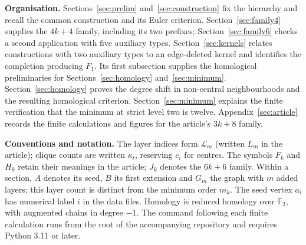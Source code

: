 \noindent\textbf{Organisation.}
Sections~\ref{sec:prelim} and~\ref{sec:construction} fix the hierarchy and
recall the common construction and its Euler criterion. Section~\ref{sec:family4} supplies
the $4k+4$ family, including its two prefixes; Section~\ref{sec:family6}
checks a second application with five auxiliary types. Section~\ref{sec:kernels}
relates constructions with two auxiliary types to an edge-deleted kernel and
identifies the completion producing $F_1$. Its first subsection supplies the
homological preliminaries for Sections~\ref{sec:homology} and~\ref{sec:minimum}.
Section~\ref{sec:homology} proves
the degree shift in non-central neighbourhoods and the resulting homological
criterion. Section~\ref{sec:minimum} explains the finite verification that the minimum at
strict level two is twelve. Appendix~\ref{sec:article} records the finite calculations and
figures for the article's $3k+8$ family.

\noindent\textbf{Conventions and notation.}
The layer indices form $\mathcal L_m$ (written $L_m$ in the article); clique counts are
written $\kappa_t$, reserving $c_i$ for centres. The symbols $F_k$ and $H_k$
retain their meanings in the article; $J_k$ denotes the $6k+6$ family.
Within a section, $A$ denotes its seed, $B$ its first extension and $G_m$ the
graph with $m$ added layers; this layer count is distinct from the minimum
order $m_k$. The seed vertex $a_i$ has numerical label $i$ in
the data files. Homology is
reduced homology over $\mathbb F_2$, with augmented chains in degree $-1$.
The command following each finite calculation runs from the root of the
accompanying repository and requires Python 3.11 or later.
